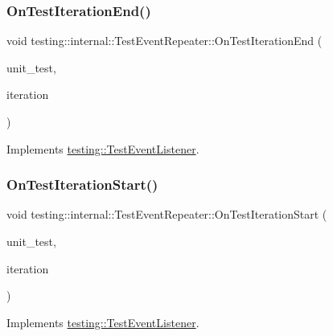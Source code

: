 \subsubsection{\texorpdfstring{On\+Test\+Iteration\+End()}{OnTestIterationEnd()}}
{\footnotesize\ttfamily void testing\+::internal\+::\+Test\+Event\+Repeater\+::\+On\+Test\+Iteration\+End (\begin{DoxyParamCaption}\item[{const \hyperlink{classtesting_1_1_unit_test}{Unit\+Test} \&}]{unit\+\_\+test,  }\item[{int}]{iteration }\end{DoxyParamCaption})\hspace{0.3cm}{\ttfamily [virtual]}}



Implements \hyperlink{classtesting_1_1_test_event_listener_a550fdb3e55726e4cefa09f5697941425}{testing\+::\+Test\+Event\+Listener}.

\mbox{\label{classtesting_1_1internal_1_1_test_event_repeater_a4062b3f070bb6531ab8494c13d3635d3}} 
\subsubsection{\texorpdfstring{On\+Test\+Iteration\+Start()}{OnTestIterationStart()}}
{\footnotesize\ttfamily void testing\+::internal\+::\+Test\+Event\+Repeater\+::\+On\+Test\+Iteration\+Start (\begin{DoxyParamCaption}\item[{const \hyperlink{classtesting_1_1_unit_test}{Unit\+Test} \&}]{unit\+\_\+test,  }\item[{int}]{iteration }\end{DoxyParamCaption})\hspace{0.3cm}{\ttfamily [virtual]}}



Implements \hyperlink{classtesting_1_1_test_event_listener_a60cc09b7907cb329d152eb5e7133bdeb}{testing\+::\+Test\+Event\+Listener}.

\mbox{\label{classtesting_1_1internal_1_1_test_event_repeater_ac8fb21da6802b1ebab9cad3eee9150eb}} 
